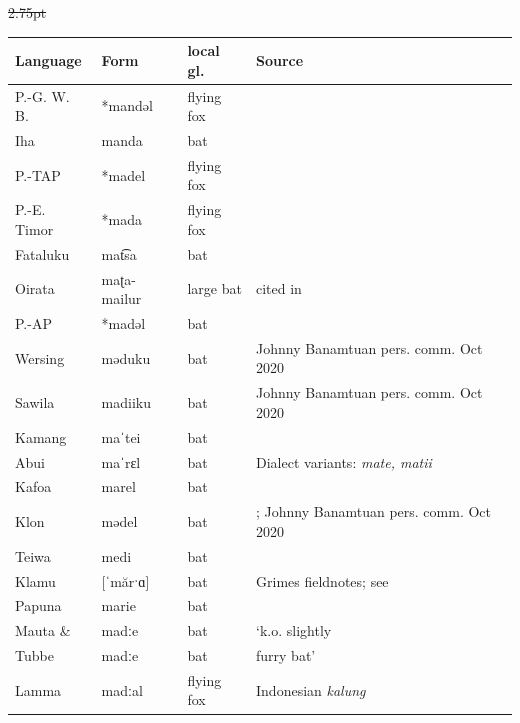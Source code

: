 \begin{table}[h]\centering{}
	\begin{threeparttable}
	\st{2.75pt}\begin{tabularx}{\textwidth}{l|ll>{\raggedright\arraybackslash}X}\lsptoprule
Language	&	Form	&	local gl.	&	Source	\\	\midrule
P.-G. W. B.	&	*mandəl	&	flying fox	&	\citet[493]{UsherSchapper2022}	\\	\midrule
Iha	&	manda	&	bat	&	\citet[122]{SmitsVoorhoeve1998}	\\	\midrule
P.-TAP\su{†}	&	*madel	&	flying fox	&	\citet[493]{UsherSchapper2022}	\\
P.-E. Timor	&	*mada	&	flying fox	&	\citet[493]{UsherSchapper2022}	\\	\midrule
Fataluku	&	mat͡sa	&	bat	&	\citet[189]{Heston2015}	\\
Oirata	&	maʈa-mailur	&	large bat	&	\citet{DeJosselinDeJong1937} cited in \citet[493]{UsherSchapper2022}	\\	\midrule
P.-AP	&	*madəl	&	bat	&	\citet[78]{HoltonRobinson2017}	\\	\midrule
Wersing	&	məduku	&	bat	&	Johnny Banamtuan pers. comm. Oct 2020	\\
Sawila\su{†}	&	madiiku 	&	bat	&	Johnny Banamtuan pers. comm. Oct 2020	\\
Kamang	&	maˈtei	&	bat	&	\citet[87]{SchapperManimau2011}	\\
Abui	&	maˈrɛl	&	bat	&	Dialect variants: \it{mate, matii}	\\
Kafoa	&	marel	&	bat	&	\citet[85]{KratochvilDelpada2008}	\\
Klon	&	mədel	&	bat	&	\citet[269]{Schapper2011}; Johnny Banamtuan pers. comm. Oct 2020	\\
Teiwa	&	medi	&	bat	&	\citet[35]{KlamerSir2011}	\\
Klamu\su{‡}	&	[ˈmărˑɑ]	&	bat	&	Grimes fieldnotes; see \srf{02-04-06} 	\\
Papuna	&	marie	&	bat	&	\citet{Delpada2011}	\\
Mauta {\&}	&	madːe	&	bat	&	\citet[92]{HoltonKoly2008} `k.o. slightly	\\
Tubbe	&	madːe	&	bat	&	furry bat'	\\
Lamma	&	madːal	&	flying fox	&	\citet[92]{HoltonKoly2008} Indonesian \it{kalung}	\\

\end{tabularx}
\end{threeparttable}
\end{table}

